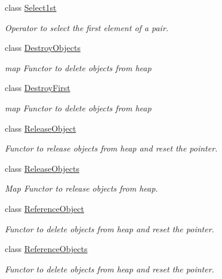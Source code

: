 \begin{DoxyCompactItemize}
class \hyperlink{class_d_d4hep_1_1_select1st}{Select1st}
\begin{DoxyCompactList}\small\item\em Operator to select the first element of a pair. \item\end{DoxyCompactList}\item 
class \hyperlink{class_d_d4hep_1_1_destroy_objects}{DestroyObjects}
\begin{DoxyCompactList}\small\item\em map Functor to delete objects from heap \item\end{DoxyCompactList}\item 
class \hyperlink{class_d_d4hep_1_1_destroy_first}{DestroyFirst}
\begin{DoxyCompactList}\small\item\em map Functor to delete objects from heap \item\end{DoxyCompactList}\item 
class \hyperlink{class_d_d4hep_1_1_release_object}{ReleaseObject}
\begin{DoxyCompactList}\small\item\em Functor to release objects from heap and reset the pointer. \item\end{DoxyCompactList}\item 
class \hyperlink{class_d_d4hep_1_1_release_objects}{ReleaseObjects}
\begin{DoxyCompactList}\small\item\em Map Functor to release objects from heap. \item\end{DoxyCompactList}\item 
class \hyperlink{class_d_d4hep_1_1_reference_object}{ReferenceObject}
\begin{DoxyCompactList}\small\item\em Functor to delete objects from heap and reset the pointer. \item\end{DoxyCompactList}\item 
class \hyperlink{class_d_d4hep_1_1_reference_objects}{ReferenceObjects}
\begin{DoxyCompactList}\small\item\em Functor to delete objects from heap and reset the pointer. \item\end{DoxyCompactList}\item 

\end{DoxyCompactItemize}

